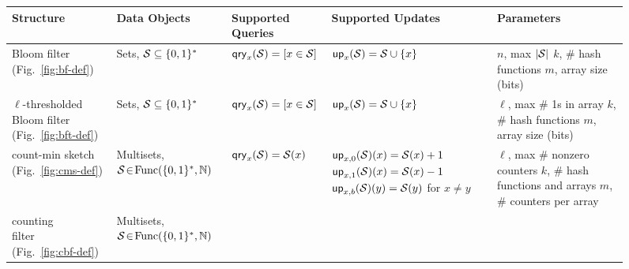 \begin{figure*}[tp]
\begin{center}
\scriptsize
  \begin{tabular}{ |p{1.75cm} | p{2.5cm} | p{2.95cm} | p{4cm} | p{3.7cm}|}
    \hline
    {\bf Structure} & {\bf Data Objects} & {\bf Supported Queries} & {\bf Supported Updates} & {\bf Parameters} \\ \hline
    \parbox[c]{1.75cm}{Bloom filter\\ (Fig.~\ref{fig:bf-def})}
          & \parbox[c][6ex]{2.5cm}{Sets,\\$\mathcal{S}\subseteq \{0,1\}^*$} %
          & $\mathsf{qry}_x(\mathcal{S}) = [x \in \mathcal{S}]$
          &  $\mathsf{up}_x(\mathcal{S}) = \mathcal{S} \cup \{x\}$
          & \parbox[c]{4cm}{$n$, max $|\mathcal{S}|$\\$k$, \# hash functions\\$m$, array size (bits)}
          \\\hline
     \parbox[c]{2cm}{$\ell$-thresholded\\ Bloom filter\\ (Fig.~\ref{fig:bft-def})}
          & \parbox[c]{2.5cm}{Sets,\\ $\mathcal{S} \subseteq \{0,1\}^*$}
          & $\mathsf{qry}_x(\mathcal{S}) = [x \in \mathcal{S}]$
          & \parbox[c][10ex]{4cm}{$\mathsf{up}_x(\mathcal{S}) = \mathcal{S} \cup \{x\}$}
          & \parbox[c]{3.75cm}{$\ell$, max \# 1s in array\\$k$, \# hash functions\\$m$, array size (bits)}
          \\ \hline
     \parbox[c]{2cm}{count-min sketch\\ (Fig.~\ref{fig:cms-def})}
          & \parbox[c]{2.5cm}{Multisets,\\ $\mathcal{S}\!\in\! \mathrm{Func}(\{0,1\}^*,\mathbb{N})$}
          & $\mathsf{qry}_x(\mathcal{S}) = \mathcal{S}(x)$
          & \parbox[c][10ex]{4cm}{$\mathsf{up}_{x,0}(\mathcal{S})(x) = \mathcal{S}(x)+1$ \\ $\mathsf{up}_{x,1}(\mathcal{S})(x) = \mathcal{S}(x)-1$ \\ $\mathsf{up}_{x,b}(\mathcal{S})(y) = \mathcal{S}(y)$ for $x \neq y$}
          & \parbox[c]{3.75cm}{$\ell$, max \# nonzero counters\\$k$,
          \# hash functions and arrays\\$m$, \# counters per array}
          \\ \hline
    \parbox[c]{1.5cm}{counting\\ filter\\ (Fig.~\ref{fig:cbf-def})}
          & \parbox[c]{2.5cm}{Multisets,\\ $\mathcal{S} \!\in\! \mathrm{Func}(\{0,1\}^*,\mathbb{N})$}

\end{tabular}
\end{center}
\end{figure*}
